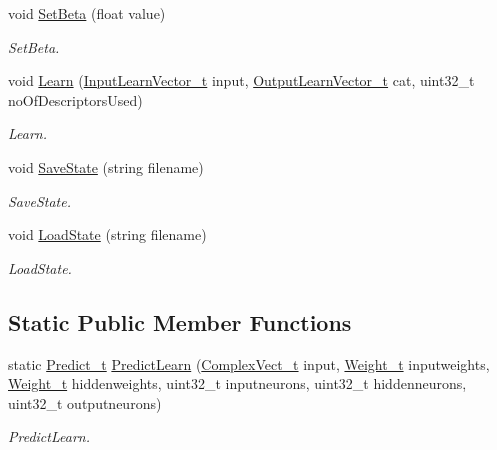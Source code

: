 \begin{DoxyCompactItemize}
void \hyperlink{class_soil_math_1_1_n_n_a5a73fdf65b39d81b6185de3a3b315cdb}{Set\+Beta} (float value)
\begin{DoxyCompactList}\small\item\em Set\+Beta. \end{DoxyCompactList}\item 
void \hyperlink{class_soil_math_1_1_n_n_a8550b524ed096712bb2fad9fa57b8c8d}{Learn} (\hyperlink{_soil_math_types_8h_a45aa81992bf0ddf272907bd4fa0b96cf}{Input\+Learn\+Vector\+\_\+t} input, \hyperlink{_soil_math_types_8h_a2d8b5a261688166d724b68addd8561e6}{Output\+Learn\+Vector\+\_\+t} cat, uint32\+\_\+t no\+Of\+Descriptors\+Used)
\begin{DoxyCompactList}\small\item\em Learn. \end{DoxyCompactList}\item 
void \hyperlink{class_soil_math_1_1_n_n_ac01bcc755578095ebf1f1f0e951f2678}{Save\+State} (string filename)
\begin{DoxyCompactList}\small\item\em Save\+State. \end{DoxyCompactList}\item 
void \hyperlink{class_soil_math_1_1_n_n_a69c00e336b11531e25d51262da10fea0}{Load\+State} (string filename)
\begin{DoxyCompactList}\small\item\em Load\+State. \end{DoxyCompactList}\end{DoxyCompactItemize}
\subsection*{Static Public Member Functions}
\begin{DoxyCompactItemize}
\item 
static \hyperlink{_soil_math_types_8h_aaeba766195a440b2539f0438d3d41f95}{Predict\+\_\+t} \hyperlink{class_soil_math_1_1_n_n_ac758bdef758439af30a62c486dff79ca}{Predict\+Learn} (\hyperlink{_soil_math_types_8h_a7567e521c2b2c408dcb62dbff72390f7}{Complex\+Vect\+\_\+t} input, \hyperlink{_soil_math_types_8h_ac56ad2b88186620fd0de0d213aa715dd}{Weight\+\_\+t} inputweights, \hyperlink{_soil_math_types_8h_ac56ad2b88186620fd0de0d213aa715dd}{Weight\+\_\+t} hiddenweights, uint32\+\_\+t inputneurons, uint32\+\_\+t hiddenneurons, uint32\+\_\+t outputneurons)
\begin{DoxyCompactList}\small\item\em Predict\+Learn. \end{DoxyCompactList}\end{DoxyCompactItemize}
